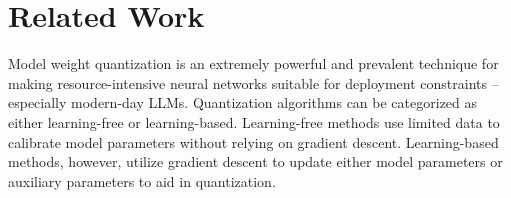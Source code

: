 \section{Related Work}
\label{sec:rw}







Model weight quantization is an extremely powerful and prevalent technique for making resource-intensive neural networks suitable for deployment constraints -- especially modern-day LLMs. Quantization algorithms can be categorized as either learning-free or learning-based. Learning-free methods use limited data to calibrate model parameters without relying on gradient descent. Learning-based methods, however, utilize gradient descent to update either model parameters or auxiliary parameters to aid in quantization.

\vspace{-4mm}
